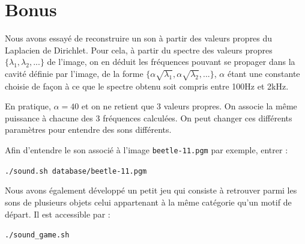 \documentclass[a4paper,10pt]{article} %
\theoremstyle{definition} %
\begin{document}
\section*{Bonus}

Nous avons essayé de reconstruire un son à partir des valeurs propres du Laplacien de Dirichlet. Pour cela, à partir du spectre des valeurs propres $\{\lambda_1, \lambda_2, ...\}$ de l'image, on en déduit les fréquences pouvant se propager dans la cavité définie par l'image, de la forme $\{\alpha \sqrt{\lambda_1}, \alpha \sqrt{\lambda_2}, ...\}$, $\alpha$ étant une constante choisie de façon à ce que le spectre obtenu soit compris entre 100Hz et 2kHz.

En pratique, $\alpha = 40$ et on ne retient que 3 valeurs propres. On associe la même puissance à chacune des 3 fréquences calculées. On peut changer ces différents paramètres pour entendre des sons différents.

Afin d'entendre le son associé à l'image \texttt{beetle-11.pgm} par exemple, entrer : 
\begin{center}
  \texttt{./sound.sh database/beetle-11.pgm}
\end{center}

Nous avons également développé un petit jeu qui consiste à retrouver parmi les sons de plusieurs objets celui appartenant à la même catégorie qu'un motif de départ. 
Il est accessible par :
\begin{center}
  \texttt{./sound\_game.sh}
\end{center}




\nocite{*}
\end{document}
